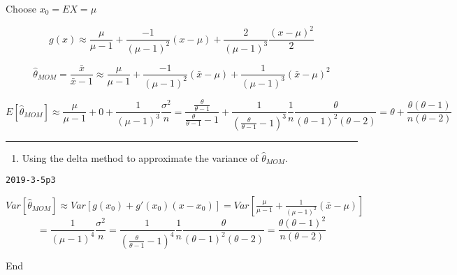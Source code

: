 \documentclass[12pt,]{article}
\newenvironment{Shaded}{\begin{snugshade}}{\end{snugshade}}
\newcommand{\NormalTok}[1]{#1}
\providecommand{\tightlist}{%
  \setlength{\itemsep}{0pt}\setlength{\parskip}{0pt}}
\begin{document}
Choose \(x_0=EX=\mu\)

\[g(x)\approx \frac{\mu}{\mu-1}+\frac{-1}{(\mu-1)^2}(x-\mu)+\frac{2}{(\mu-1)^3}\frac{(x-\mu)^2}2\]

\[\hat\theta_{MOM}=\frac{\bar x}{\bar x-1}\approx \frac{\mu}{\mu-1}+\frac{-1}{(\mu-1)^2}(\bar x-\mu)+\frac{1}{(\mu-1)^3}(\bar x-\mu)^2\]

\[E[\hat\theta_{MOM}]\approx \frac{\mu}{\mu-1}+0+\frac{1}{(\mu-1)^3}\frac{\sigma^2}n=\frac{\frac\theta{\theta-1}}{\frac\theta{\theta-1}-1}+\frac{1}{(\frac\theta{\theta-1}-1)^3}\frac1n\frac{\theta}{(\theta-1)^2(\theta-2)}=\theta+\frac{\theta(\theta-1)}{n(\theta-2)}\]

\begin{center}\rule{0.5\linewidth}{\linethickness}\end{center}

\begin{enumerate}
\def\labelenumi{\alph{enumi}.}
\setcounter{enumi}{2}
\tightlist
\item
  \textcolor[rgb]{0.5,0.5,0.5}{Using the delta method to approximate the variance of $\hat\theta_{MOM}$.}
\end{enumerate}

\texttt{2019-3-5p3}

\(Var[\hat\theta_{MOM}]\approx Var[g(x_0)+g'(x_0)(x-x_0)]=Var[\frac{\mu}{\mu-1}+\frac{1}{(\mu-1)^2}(\bar x-\mu)]\)
\[=\frac{1}{(\mu-1)^4}\frac{\sigma^2}n=\frac{1}{(\frac\theta{\theta-1}-1)^4}\frac1n\frac{\theta}{(\theta-1)^2(\theta-2)}=\frac{\theta(\theta-1)^2}{n(\theta-2)}\]

\begin{Shaded}
\begin{Highlighting}[]
\NormalTok{End}
\end{Highlighting}
\end{Shaded}
\end{document}
